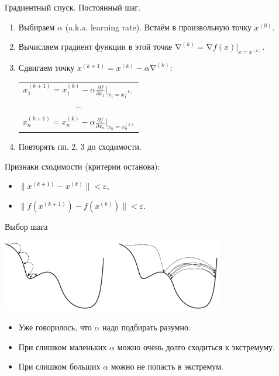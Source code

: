 \documentclass[9pt]{beamer}
\begin{document}
\begin{frame}{Градиентный спуск. Постоянный шаг.}
\begin{enumerate}
    \item Выбираем $\alpha$ (a.k.a. learning rate). Встаём в произвольную точку $x^{(0)}$.
    \item Вычисляем градиент функции в этой точке $\mathop{\nabla}^{(k)} = \mathop{\nabla} f(x)\big|_{x=x^{(k)}}$.
    \item Сдвигаем точку $x^{(k+1)} = x^{(k)} - \alpha \mathop{\nabla}^{(k)}$:
    \begin{center}
        \begin{tabular}{c}
             $x^{(k+1)}_1 = x^{(k)}_1 - \alpha \frac{\partial f}{\partial x_1}\big|_{x_1 = x^{(k)}_1}$\\
             $\cdots$\\
             $x^{(k+1)}_n = x^{(k)}_n - \alpha \frac{\partial f}{\partial x_n}\big|_{x_n = x^{(k)}_n}$\\
        \end{tabular}
    \end{center}
    \item Повторять пп. 2, 3 до сходимости. 
\end{enumerate}

Признаки сходимости (критерии останова):
\begin{itemize}
    \item $\|x^{(k+1)} - x^{(k)}\| < \varepsilon$,
    \item $\|f(x^{(k+1)}) - f(x^{(k)})\| < \varepsilon$.
\end{itemize}
\end{frame}




\begin{frame}{Выбор шага}
\begin{center}\includegraphics[height=120px, width=\textwidth]{img/gradient_descent_learning_rate.png}\end{center}
\begin{itemize}
    \item Уже говорилось, что $\alpha$ надо подбирать разумно.
    \item При слишком маленьких $\alpha$ можно очень долго сходиться к экстремуму.
    \item При слишком больших $\alpha$ можно не попасть в экстремум.
\end{itemize}
\end{frame}
\end{document}
